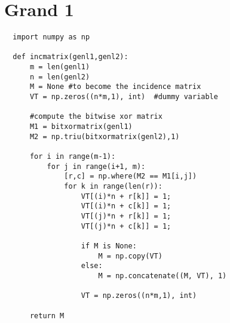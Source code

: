 \documentclass{article}
\begin{document}

\section{Grand 1}

\begin{verbatim}
  import numpy as np
      
  def incmatrix(genl1,genl2):
      m = len(genl1)
      n = len(genl2)
      M = None #to become the incidence matrix
      VT = np.zeros((n*m,1), int)  #dummy variable
      
      #compute the bitwise xor matrix
      M1 = bitxormatrix(genl1)
      M2 = np.triu(bitxormatrix(genl2),1) 
  
      for i in range(m-1):
          for j in range(i+1, m):
              [r,c] = np.where(M2 == M1[i,j])
              for k in range(len(r)):
                  VT[(i)*n + r[k]] = 1;
                  VT[(i)*n + c[k]] = 1;
                  VT[(j)*n + r[k]] = 1;
                  VT[(j)*n + c[k]] = 1;
                  
                  if M is None:
                      M = np.copy(VT)
                  else:
                      M = np.concatenate((M, VT), 1)
                  
                  VT = np.zeros((n*m,1), int)
      
      return M
  \end{verbatim}
\end{document}
